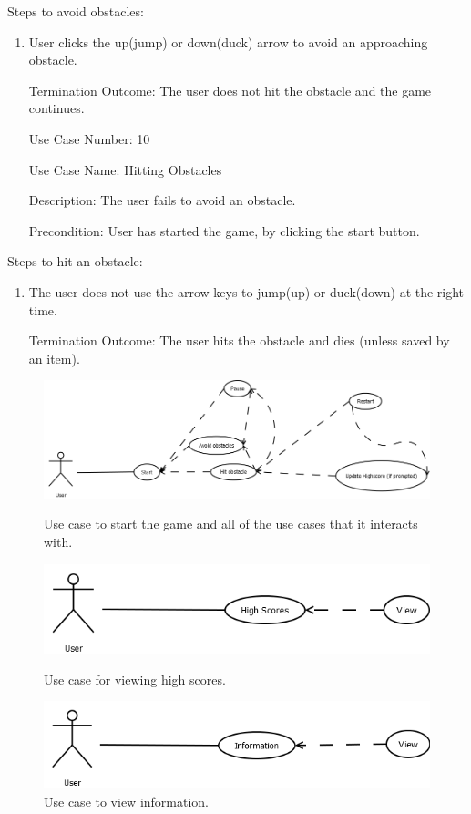 \documentclass[10pt,conference,onecolumn,compsoc]{IEEEtran}
\begin{document}
Steps to avoid obstacles:

\begin{enumerate}
\item User clicks the up(jump) or down(duck) arrow to avoid an approaching obstacle.
\item[Termination Outcome:] The user does not hit the obstacle and the game continues.\\
\end{enumerate}

\begin{itemize}
\item[Use Case Number:] 10
\item[Use Case Name:] Hitting Obstacles
\item[Description:] The user fails to avoid an obstacle.
\item[Precondition:] User has started the game, by clicking the start button.
\end{itemize}

Steps to hit an obstacle:

\begin{enumerate}
\item The user does not use the arrow keys to jump(up) or duck(down) at the right time.
\item[Termination Outcome:]The user hits the obstacle and dies (unless saved by an item).
\end{enumerate}


\begin{figure}[h!]
\centering
\includegraphics[scale=.4]{Start.png}
\caption{Use case to start the game and all of the use cases that it interacts with.}
\label{Start}

\includegraphics[scale=.5]{HighScores.png}
\caption{Use case for viewing high scores.}
\label{Scores}

\includegraphics[scale=.5]{Information.png}
\caption{Use case to view information.}
\label{Info}
\end{figure}
\end{document}
